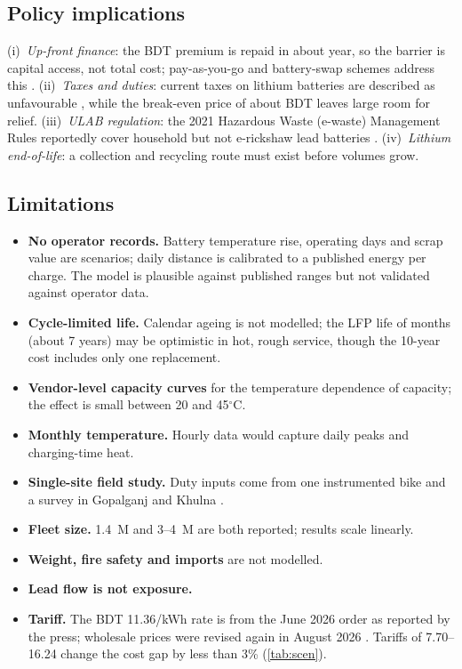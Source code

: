 \subsection{Policy implications}
(i)~\emph{Up-front finance}: the BDT \premium{} premium is repaid in about \paybackYr{} year, so the barrier is capital access, not total cost; pay-as-you-go and battery-swap schemes address this \citep{smep2024}. (ii)~\emph{Taxes and duties}: current taxes on lithium batteries are described as unfavourable \citep{smep2024}, while the break-even price of about BDT \beLFP{} leaves large room for relief. (iii)~\emph{ULAB regulation}: the 2021 Hazardous Waste (e-waste) Management Rules reportedly cover household but not e-rickshaw lead batteries \citep{smep2024}. (iv)~\emph{Lithium end-of-life}: a collection and recycling route must exist before volumes grow.

\subsection{Limitations}\label{sec:limits}
\begin{itemize}[nosep]
\item \textbf{No operator records.} Battery temperature rise, operating days and scrap value are scenarios; daily distance is calibrated to a published energy per charge. The model is plausible against published ranges but not validated against operator data.
\item \textbf{Cycle-limited life.} Calendar ageing is not modelled; the LFP life of \lifeLFP{} months (about 7 years) may be optimistic in hot, rough service, though the 10-year cost includes only one replacement.
\item \textbf{Vendor-level capacity curves} for the temperature dependence of capacity; the effect is small between 20 and 45$^\circ$C.
\item \textbf{Monthly temperature.} Hourly data would capture daily peaks and charging-time heat.
\item \textbf{Single-site field study.} Duty inputs come from one instrumented bike and a survey in Gopalganj and Khulna \citep{chowdhury2026}.
\item \textbf{Fleet size.} 1.4~M and 3--4~M are both reported; results scale linearly.
\item \textbf{Weight, fire safety and imports} are not modelled.
\item \textbf{Lead flow is not exposure.}
\item \textbf{Tariff.} The BDT 11.36/kWh rate is from the June 2026 order as reported by the press; wholesale prices were revised again in August 2026 \citep{observer2026}. Tariffs of 7.70--16.24 change the cost gap by less than 3\% (\cref{tab:scen}).
\end{itemize}
